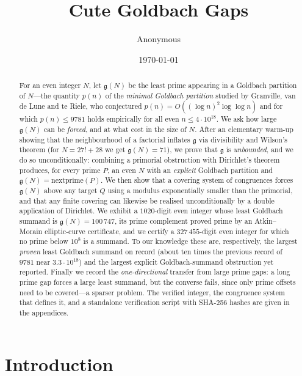 \documentclass[11pt]{article}
\title{\bf Cute Goldbach Gaps}
\author{Anonymous}
\date{\today}
\theoremstyle{plain}
\theoremstyle{definition}
\theoremstyle{remark}
\newcommand{\N}{N}
\newcommand{\g}{\mathfrak{g}}
\begin{document}
\maketitle

\begin{abstract}
For an even integer $\N$, let $\g(\N)$ be the least prime appearing in a
Goldbach partition of $\N$---the quantity $p(n)$ of the \emph{minimal Goldbach
partition} studied by Granville, van de Lune and te Riele, who conjectured
$p(n)=O((\log n)^2\log\log n)$ and for which $p(n)\le 9781$ holds empirically for
all even $n\le4\cdot10^{18}$. We ask how large $\g(\N)$ can be \emph{forced}, and
at what cost in the size of $\N$. After an elementary warm-up showing that the
neighbourhood of a factorial inflates $\g$ via divisibility and Wilson's theorem
(for $\N=27!+28$ we get $\g(\N)=71$), we prove that $\g$ is \emph{unbounded}, and
we do so unconditionally: combining a primorial obstruction with Dirichlet's
theorem produces, for every prime $P$, an even $\N$ with an \emph{explicit}
Goldbach partition and $\g(\N)=\mathrm{nextprime}(P)$. We then show that a
covering system of congruences forces $\g(\N)$ above any target $Q$ using a
modulus exponentially smaller than the primorial, and that any finite covering
can likewise be realised unconditionally by a double application of Dirichlet.
We exhibit a $1020$-digit even integer whose least Goldbach summand is
$\g(\N)=100\,747$, its prime complement proved prime by an Atkin--Morain
elliptic-curve certificate, and we certify a $327\,455$-digit even integer for
which no prime below $10^8$ is a summand. To our knowledge these are,
respectively, the largest \emph{proven} least Goldbach summand on record (about
ten times the previous record of $9781$ near $3.3\cdot10^{18}$) and the largest
explicit Goldbach-summand obstruction yet reported.
Finally we record the
\emph{one-directional} transfer from large prime gaps: a long prime gap forces a
large least summand, but the converse fails, since only prime offsets need to be
covered---a sparser problem. The verified integer, the congruence system that
defines it, and a standalone verification script with SHA-256 hashes are given in
the appendices.
\end{abstract}

\section{Introduction}
\end{document}
